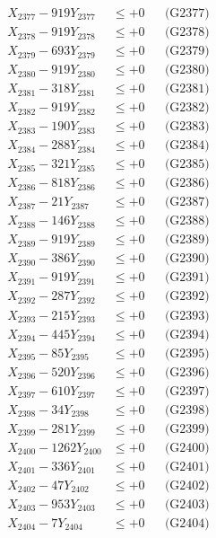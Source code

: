 \documentclass[a4paper,10pt]{article}
\begin{document}
{\begin{align}
X_{2377} - 919Y_{2377} &\leq +0 && \text{(G2377)} \\
X_{2378} - 919Y_{2378} &\leq +0 && \text{(G2378)} \\
X_{2379} - 693Y_{2379} &\leq +0 && \text{(G2379)} \\
X_{2380} - 919Y_{2380} &\leq +0 && \text{(G2380)} \\
\allowbreak
X_{2381} - 318Y_{2381} &\leq +0 && \text{(G2381)} \\
X_{2382} - 919Y_{2382} &\leq +0 && \text{(G2382)} \\
X_{2383} - 190Y_{2383} &\leq +0 && \text{(G2383)} \\
X_{2384} - 288Y_{2384} &\leq +0 && \text{(G2384)} \\
X_{2385} - 321Y_{2385} &\leq +0 && \text{(G2385)} \\
X_{2386} - 818Y_{2386} &\leq +0 && \text{(G2386)} \\
X_{2387} - 21Y_{2387} &\leq +0 && \text{(G2387)} \\
X_{2388} - 146Y_{2388} &\leq +0 && \text{(G2388)} \\
X_{2389} - 919Y_{2389} &\leq +0 && \text{(G2389)} \\
X_{2390} - 386Y_{2390} &\leq +0 && \text{(G2390)} \\
\allowbreak
X_{2391} - 919Y_{2391} &\leq +0 && \text{(G2391)} \\
X_{2392} - 287Y_{2392} &\leq +0 && \text{(G2392)} \\
X_{2393} - 215Y_{2393} &\leq +0 && \text{(G2393)} \\
X_{2394} - 445Y_{2394} &\leq +0 && \text{(G2394)} \\
X_{2395} - 85Y_{2395} &\leq +0 && \text{(G2395)} \\
X_{2396} - 520Y_{2396} &\leq +0 && \text{(G2396)} \\
X_{2397} - 610Y_{2397} &\leq +0 && \text{(G2397)} \\
X_{2398} - 34Y_{2398} &\leq +0 && \text{(G2398)} \\
X_{2399} - 281Y_{2399} &\leq +0 && \text{(G2399)} \\
X_{2400} - 1262Y_{2400} &\leq +0 && \text{(G2400)} \\
\allowbreak
X_{2401} - 336Y_{2401} &\leq +0 && \text{(G2401)} \\
X_{2402} - 47Y_{2402} &\leq +0 && \text{(G2402)} \\
X_{2403} - 953Y_{2403} &\leq +0 && \text{(G2403)} \\
X_{2404} - 7Y_{2404} &\leq +0 && \text{(G2404)} \\

\end{align}}
\end{document}

